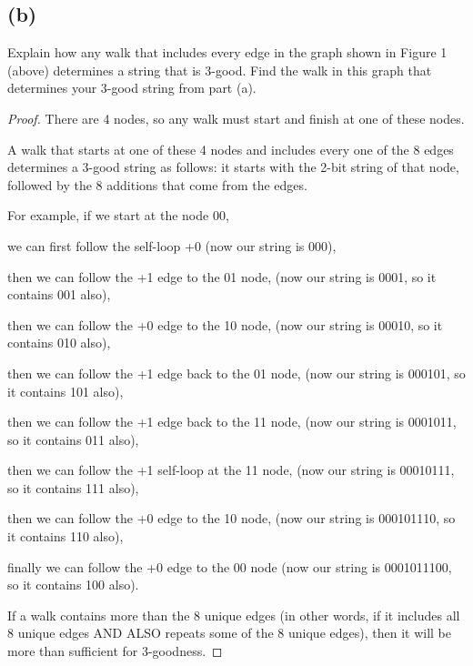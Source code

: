 \documentclass[14pt]{extarticle}
\begin{document}
\subsection{(b)}
Explain how any walk that includes every edge in the graph shown in Figure 1 (above) determines a string that is 3-good. Find the walk in this graph that determines your 3-good string from part (a).
\begin{proof}
There are 4 nodes, so any walk must start and finish at one of these nodes.

A walk that starts at one of these 4 nodes and includes every one of the 8 edges determines a 3-good string as follows: it starts with the 2-bit string of that node, followed by the 8 additions that come from the edges.

For example, if we start at the node 00, 

we can first follow the self-loop +0 (now our string is 000), 

then we can follow the +1 edge to the 01 node, (now our string is 0001, so it contains 001 also),

then we can follow the +0 edge to the 10 node, (now our string is 00010, so it contains 010 also),

then we can follow the +1 edge back to the 01 node, (now our string is 000101, so it contains 101 also),

then we can follow the +1 edge back to the 11 node, (now our string is 0001011, so it contains 011 also),

then we can follow the +1 self-loop at the 11 node, (now our string is 00010111, so it contains 111 also),

then we can follow the +0 edge to the 10 node, (now our string is 000101110, so it contains 110 also),

finally we can follow the +0 edge to the 00 node (now our string is 0001011100, so it contains 100 also). 

If a walk contains more than the 8 unique edges (in other words, if it includes all 8 unique edges AND ALSO repeats some of the 8 unique edges), then it will be more than sufficient for 3-goodness.
\end{proof}
\end{document}

